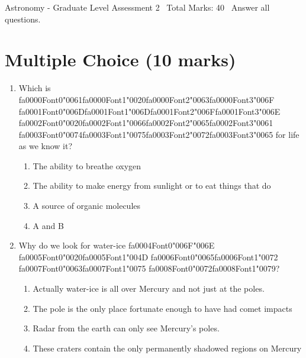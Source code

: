 \documentclass[12pt]{article}
\begin{document}
\begin{center}
Astronomy - Graduate Level Assessment 2 \
Total Marks: 40 \
Answer all questions.
\end{center}

\section*{Multiple Choice (10 marks)}
\begin{enumerate}[label=\arabic*.]
\item Which is {\csname fa0000Font0\endcsname\char"0061}{\csname fa0000Font1\endcsname\char"0020}{\csname fa0000Font2\endcsname\char"0063}{\csname fa0000Font3\endcsname\char"006F} {\csname fa0001Font0\endcsname\char"006D}{\csname fa0001Font1\endcsname\char"006D}{\csname fa0001Font2\endcsname\char"006F}{\csname fa0001Font3\endcsname\char"006E} {\csname fa0002Font0\endcsname\char"0020}{\csname fa0002Font1\endcsname\char"0066}{\csname fa0002Font2\endcsname\char"0065}{\csname fa0002Font3\endcsname\char"0061} {\csname fa0003Font0\endcsname\char"0074}{\csname fa0003Font1\endcsname\char"0075}{\csname fa0003Font2\endcsname\char"0072}{\csname fa0003Font3\endcsname\char"0065} for life as we know it?
\begin{enumerate}[label=(\alph*)]
    \item The ability to breathe oxygen
    \item The ability to make energy from sunlight or to eat things that do
    \item A source of organic molecules
    \item A and B
\end{enumerate}
\item Why do we look for water-ice {\csname fa0004Font0\endcsname\char"006F}{\char"006E} {\csname fa0005Font0\endcsname\char"0020}{\csname fa0005Font1\endcsname\char"004D} {\csname fa0006Font0\endcsname\char"0065}{\csname fa0006Font1\endcsname\char"0072} {\csname fa0007Font0\endcsname\char"0063}{\csname fa0007Font1\endcsname\char"0075} {\csname fa0008Font0\endcsname\char"0072}{\csname fa0008Font1\endcsname\char"0079}?
\begin{enumerate}[label=(\alph*)]
    \item Actually water-ice is all over Mercury and not just at the poles.
    \item The pole is the only place fortunate enough to have had comet impacts
    \item Radar from the earth can only see Mercury's poles.
    \item These craters contain the only permanently shadowed regions on Mercury

\end{enumerate}
\end{enumerate}
\end{document}
